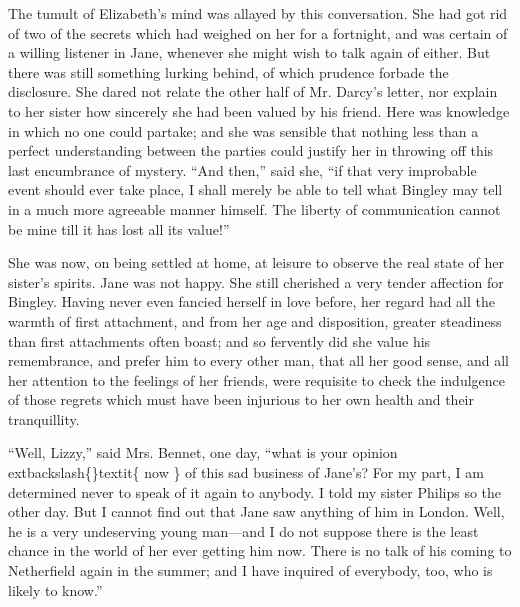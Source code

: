 \documentclass[10pt]{book}
\begin{document}
   The tumult of Elizabeth’s mind was allayed by this
   conversation. She
had got rid of two of the secrets which had weighed on her for a
fortnight, and was certain of a willing listener in Jane, whenever she
might wish to talk again of either. But there was still something
lurking behind, of which prudence forbade the disclosure. She dared not
relate the other half of Mr. Darcy’s letter, nor explain to her sister
how sincerely she had been valued by his friend. Here was knowledge in
which no one could partake; and she was sensible that nothing less than
a perfect understanding between the parties could justify her in
throwing off this last encumbrance of mystery. “And then,” said she, “if
that very improbable event should ever take place, I shall merely be
able to tell what Bingley may tell in a much more agreeable manner
himself. The liberty of communication cannot be mine till it has lost
all its value!”
  

   She was now, on being settled at home, at leisure to observe the real
state of her sister’s spirits. Jane was not happy. She still cherished a
very tender affection for Bingley. Having never even fancied herself in
love before, her regard had all the warmth of first attachment, and from
her age and disposition, greater steadiness than first attachments often
boast; and so fervently did she value his remembrance, and prefer him to
every other man, that all her good sense, and all her attention to the
feelings of her friends, were requisite to check the indulgence of those
regrets which must have been injurious to her own health and their
tranquillity.
  

   “Well, Lizzy,” said Mrs. Bennet, one day, “what is your opinion
   	extbackslash\{\}textit\{
    now
   \}
   of
this sad business of Jane’s? For my part, I am determined never to speak
of it again to anybody. I told my sister Philips so the other day. But I
cannot find out that Jane saw anything of him in
   London. Well, he is a
very undeserving young man—and I do not suppose there is the least
chance in the world of her ever getting him now. There is no talk of his
coming to Netherfield again in the summer; and I have inquired of
everybody, too, who is likely to know.”
  
\end{document}
